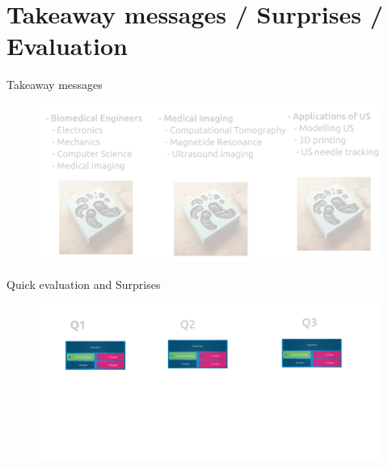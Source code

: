 \section{Takeaway messages / Surprises / Evaluation}



{
\begin{frame}{Takeaway messages}
  \begin{figure}
  \centering
  \includegraphics[width=1.0\textwidth]{./figures/takeaways/versions/drawing-v01}
  \end{figure}

\end{frame}
}

{
\begin{frame}{Quick evaluation and Surprises}
  \begin{figure}
  \centering
  \includegraphics[width=1.0\textwidth]{./figures/evaluation-souvenirs/versions/drawing-v00}
  \end{figure}

\end{frame}
}

